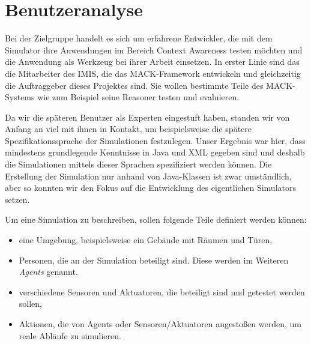 
\section{Benutzeranalyse}\label{sec:user_ana}

Bei der Zielgruppe handelt es sich um erfahrene Entwickler, die mit dem Simulator ihre Anwendungen im Bereich Context Awareness testen möchten und die Anwendung als Werkzeug bei ihrer Arbeit einsetzen. In erster Linie sind das die Mitarbeiter des IMIS, die das MACK-Framework entwickeln und gleichzeitig die Auftraggeber dieses Projektes sind. Sie wollen bestimmte Teile des MACK-Systems wie zum Beispiel seine Reasoner testen und evaluieren.

Da wir die späteren Benutzer als Experten eingestuft haben, standen wir von Anfang an viel mit ihnen in Kontakt, um beispielsweise die spätere Spezifikationssprache der Simulationen festzulegen. Unser Ergebnis war hier, dass mindestens grundlegende Kenntnisse in Java und XML gegeben sind und deshalb die Simulationen mittels dieser Sprachen spezifiziert werden können. Die Erstellung der Simulation nur anhand von Java-Klassen ist zwar umständlich, aber so konnten wir den Fokus auf die Entwicklung des eigentlichen Simulators setzen.

Um eine Simulation zu beschreiben, sollen folgende Teile definiert werden können:
\begin{itemize}
\item eine Umgebung, beispielsweise ein Gebäude mit Räumen und Türen,
\item Personen, die an der Simulation beteiligt sind. Diese werden im Weiteren \emph{Agents} genannt.
\item verschiedene Sensoren und Aktuatoren, die beteiligt sind und getestet werden sollen,
\item Aktionen, die von Agents oder Sensoren/Aktuatoren angestoßen werden, um reale Abläufe zu simulieren.
\end{itemize}
  

